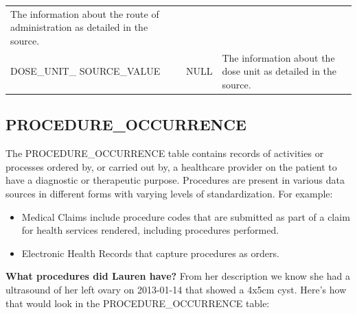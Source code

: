 \documentclass[11pt]{book}
\providecommand{\tightlist}{%
  \setlength{\itemsep}{0pt}\setlength{\parskip}{0pt}}
\begin{document}
\begin{longtable}[]{@{}lll@{}}
\begin{minipage}[t]{0.47\columnwidth}
The information about the route of administration as detailed in the
source.\strut
\end{minipage}\tabularnewline
\begin{minipage}[t]{0.30\columnwidth}\raggedright\strut
DOSE\_UNIT\_ SOURCE\_VALUE\strut
\end{minipage} & \begin{minipage}[t]{0.14\columnwidth}\raggedright\strut
NULL\strut
\end{minipage} & \begin{minipage}[t]{0.47\columnwidth}\raggedright\strut
The information about the dose unit as detailed in the source.\strut
\end{minipage}\tabularnewline
\bottomrule
\end{longtable}

\subsection{PROCEDURE\_OCCURRENCE}\label{procedureOccurrence}

The PROCEDURE\_OCCURRENCE table contains records of activities or
processes ordered by, or carried out by, a healthcare provider on the
patient to have a diagnostic or therapeutic purpose. Procedures are
present in various data sources in different forms with varying levels
of standardization. For example:

\begin{itemize}
\tightlist
\item
  Medical Claims include procedure codes that are submitted as part of a
  claim for health services rendered, including procedures performed.
\item
  Electronic Health Records that capture procedures as orders.
\end{itemize}

\textbf{What procedures did Lauren have?} From her description we know
she had a ultrasound of her left ovary on 2013-01-14 that showed a 4x5cm
cyst. Here's how that would look in the PROCEDURE\_OCCURRENCE table:
\end{document}
